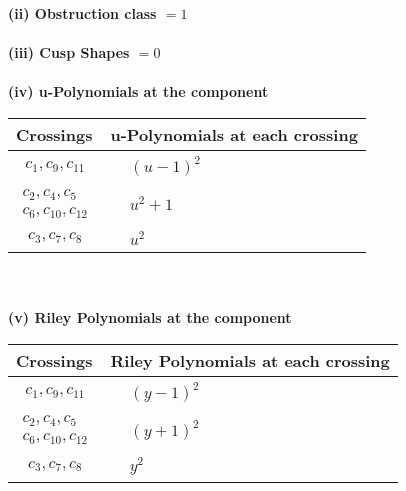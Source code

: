 \documentclass[1p]{elsarticle_modified}
\theoremstyle{definition}
\begin{document}
\flushleft \textbf{(ii) Obstruction class $= 1$}\\~\\
\flushleft \textbf{(iii) Cusp Shapes $= 0$}\\~\\
\newpage\renewcommand{\arraystretch}{1}
\flushleft \textbf{(iv) u-Polynomials at the component}\newline \\
\begin{tabular}{m{50pt}|m{274pt}}
Crossings & \hspace{64pt}u-Polynomials at each crossing \\
\hline $$\begin{aligned}c_{1},c_{9},c_{11}\end{aligned}$$&$\begin{aligned}
&(u-1)^2
\end{aligned}$\\
\hline $$\begin{aligned}c_{2},c_{4},c_{5}\\c_{6},c_{10},c_{12}\end{aligned}$$&$\begin{aligned}
&u^2+1
\end{aligned}$\\
\hline $$\begin{aligned}c_{3},c_{7},c_{8}\end{aligned}$$&$\begin{aligned}
&u^2
\end{aligned}$\\
\hline
\end{tabular}\\~\\
\newpage\renewcommand{\arraystretch}{1}
\flushleft \textbf{(v) Riley Polynomials at the component}\newline \\
\begin{tabular}{m{50pt}|m{274pt}}
Crossings & \hspace{64pt}Riley Polynomials at each crossing \\
\hline $$\begin{aligned}c_{1},c_{9},c_{11}\end{aligned}$$&$\begin{aligned}
&(y-1)^2
\end{aligned}$\\
\hline $$\begin{aligned}c_{2},c_{4},c_{5}\\c_{6},c_{10},c_{12}\end{aligned}$$&$\begin{aligned}
&(y+1)^2
\end{aligned}$\\
\hline $$\begin{aligned}c_{3},c_{7},c_{8}\end{aligned}$$&$\begin{aligned}
&y^2
\end{aligned}$\\
\hline
\end{tabular}\\~\\
\end{document}
